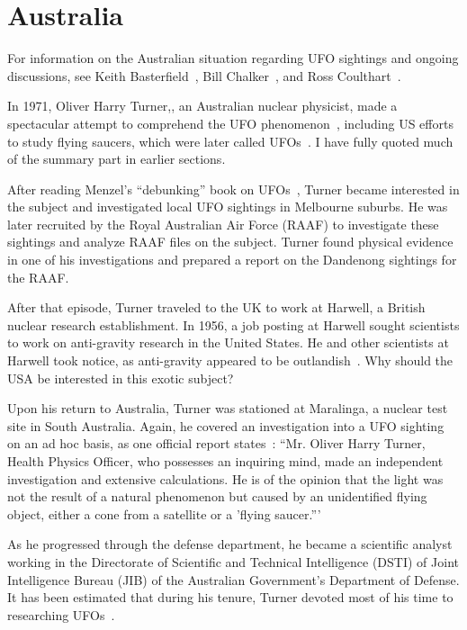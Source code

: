 \section{Australia}
\label{2023-UFO-part-Perception-types-Australia}

For information on the Australian situation regarding UFO sightings and ongoing discussions, see Keith Basterfield~\cite{Basterfield1981Jan,Basterfield-Blog}, Bill Chalker~\cite{Chalker-Ozfiles,Swords2012Jul}, and Ross Coulthart~\cite{Coulthart2021Aug}.

In 1971, Oliver Harry Turner,, an Australian nuclear physicist,
made a spectacular attempt to comprehend the UFO phenomenon~\cite{Basterfield-Blog,Swords2012Jul,Chalker22}, including US efforts to study flying saucers, which were later called UFOs~\cite{TurnerAustralia1971}.
I have fully quoted much of the summary part in earlier sections.

After reading Menzel's ``debunking'' book on UFOs~\cite{Menzel_1953}, Turner became interested in the subject and investigated local UFO sightings in Melbourne suburbs. He was later recruited by the Royal Australian Air Force (RAAF) to investigate these sightings and analyze RAAF files on the subject. Turner found physical evidence in one of his investigations and prepared a report on the Dandenong sightings for the RAAF.

After that episode, Turner traveled to the UK to work at Harwell, a British nuclear research establishment. In 1956, a job posting at Harwell sought scientists to work on anti-gravity research in the United States. He and other scientists at Harwell took notice, as anti-gravity appeared to be outlandish~\cite{Turner-bio-Chalker}. Why should the USA be interested in this exotic subject?

Upon his return to Australia, Turner was stationed at Maralinga, a nuclear test site in South Australia. Again, he covered an investigation into a UFO sighting on an ad hoc basis, as one official report states~\cite[p.~74]{Turner-WREMa}: ``Mr. Oliver Harry Turner, Health Physics Officer, who possesses an inquiring mind, made an independent investigation and extensive calculations. He is of the opinion that the light was not the result of a natural phenomenon but caused by an unidentified flying object, either a cone from a satellite or a 'flying saucer.'''

As he progressed through the defense department, he became a scientific analyst working in the Directorate of Scientific and Technical Intelligence (DSTI) of Joint Intelligence Bureau (JIB) of the Australian Government's Department of Defense. It has been estimated that during his tenure, Turner devoted most of his time to researching UFOs~\cite{Chalker22}.

